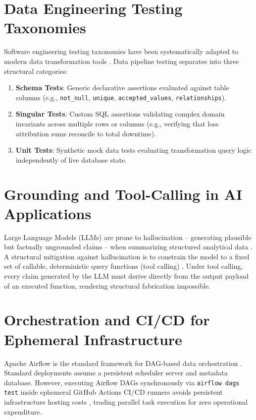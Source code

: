 \documentclass[12pt, a4paper]{report}
\begin{document}
\section{Data Engineering Testing Taxonomies}
Software engineering testing taxonomies have been systematically adapted to modern data transformation tools \cite{dbt_testing_docs}. Data pipeline testing separates into three structural categories:
\begin{enumerate}
    \item \textbf{Schema Tests}: Generic declarative assertions evaluated against table columns (e.g., \texttt{not\_null}, \texttt{unique}, \texttt{accepted\_values}, \texttt{relationships}).
    \item \textbf{Singular Tests}: Custom SQL assertions validating complex domain invariants across multiple rows or columns (e.g., verifying that loss attribution sums reconcile to total downtime).
    \item \textbf{Unit Tests}: Synthetic mock data tests evaluating transformation query logic independently of live database state.
\end{enumerate}

\section{Grounding and Tool-Calling in AI Applications}
Large Language Models (LLMs) are prone to hallucination -- generating plausible but factually ungrounded claims -- when summarizing structured analytical data \cite{ji_hallucination_survey, vaswani_attention}. A structural mitigation against hallucination is to constrain the model to a fixed set of callable, deterministic query functions (tool calling) \cite{anthropic_tool_use}. Under tool calling, every claim generated by the LLM must derive directly from the output payload of an executed function, rendering structural fabrication impossible.

\section{Orchestration and CI/CD for Ephemeral Infrastructure}
Apache Airflow is the standard framework for DAG-based data orchestration \cite{apache_airflow_docs}. Standard deployments assume a persistent scheduler server and metadata database. However, executing Airflow DAGs synchronously via \texttt{airflow dags test} inside ephemeral GitHub Actions CI/CD runners avoids persistent infrastructure hosting costs \cite{github_actions}, trading parallel task execution for zero operational expenditure.
\end{document}
